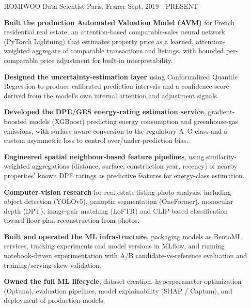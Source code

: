 

\begin{cventries}

  \cventry
    {HOMIWOO} %
    {Data Scientist} %
    {Paris, France} %
    {Sept. 2019 - PRESENT} %
    {
      \begin{cvitems} %
        \item {\textbf{Built the production Automated Valuation Model (AVM)} for French residential real estate, an attention-based comparable-sales neural network (PyTorch Lightning) that estimates property price as a learned, attention-weighted aggregate of comparable transactions and listings, with bounded per-comparable price adjustment for built-in interpretability.}
        \item {\textbf{Designed the uncertainty-estimation layer} using Conformalized Quantile Regression to produce calibrated prediction intervals and a confidence score derived from the model's own internal attention and adjustment signals.}
        \item {\textbf{Developed the DPE/GES energy-rating estimation service}, gradient-boosted models (XGBoost) predicting energy consumption and greenhouse-gas emissions, with surface-aware conversion to the regulatory A--G class and a custom asymmetric loss to control over/under-prediction bias.}
        \item {\textbf{Engineered spatial neighbour-based feature pipelines}, using similarity-weighted aggregations (distance, surface, construction year, recency) of nearby properties' known DPE ratings as predictive features for energy-class estimation.}
        \item {\textbf{Computer-vision research} for real-estate listing-photo analysis, including object detection (YOLOv5), panoptic segmentation (OneFormer), monocular depth (DPT), image-pair matching (LoFTR) and CLIP-based classification toward floor-plan reconstruction from photos.}
        \item {\textbf{Built and operated the ML infrastructure}, packaging models as BentoML services, tracking experiments and model versions in MLflow, and running notebook-driven experimentation with A/B candidate-vs-reference evaluation and training/serving-skew validation.}
        \item {\textbf{Owned the full ML lifecycle}, dataset creation, hyperparameter optimization (Optuna), evaluation pipelines, model explainability (SHAP / Captum), and deployment of production models.}
      \end{cvitems}
    }


\end{cventries}
